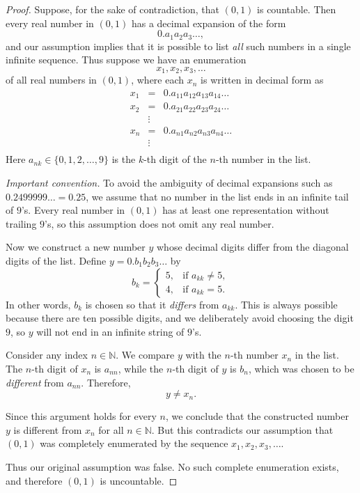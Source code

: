 \begin{proof}
Suppose, for the sake of contradiction, that $(0,1)$ is countable.
Then every real number in $(0,1)$ has a decimal expansion of the form
\[
0.a_1 a_2 a_3 \dots,
\]
and our assumption implies that it is possible to list \emph{all} such
numbers in a single infinite sequence.  Thus suppose we have an
enumeration
\[
x_1, x_2, x_3, \ldots
\]
of all real numbers in $(0,1)$, where each $x_n$ is written in decimal
form as
\[
\begin{array}{ccc}
x_1 & = & 0.a_{11} a_{12} a_{13} a_{14} \dots \\
x_2 & = & 0.a_{21} a_{22} a_{23} a_{24} \dots \\
       & \vdots & \\
x_n & = & 0.a_{n1} a_{n2} a_{n3} a_{n4} \dots \\
  & \vdots & \\
\end{array}
\]
Here $a_{nk} \in \{0,1,2,\dots,9\}$ is the $k$-th digit of the $n$-th
number in the list.

\medskip
\noindent\emph{Important convention.}  
To avoid the ambiguity of decimal expansions such as
$0.2499999\ldots = 0.25$, we assume that no number in the list ends in
an infinite tail of $9$'s.  Every real number in $(0,1)$ has at least one
representation without trailing $9$'s, so this assumption does not omit
any real number.

\medskip
Now we construct a new number $y$ whose decimal digits differ from
the diagonal digits of the list.  Define
$y = 0.b_1 b_2 b_3 \dots$ by
\[
b_k =
\begin{cases}
5, &\text{if } a_{kk} \neq 5,\\[4pt]
4, &\text{if } a_{kk} = 5.
\end{cases}
\]
In other words, $b_k$ is chosen so that it \emph{differs} from $a_{kk}$.
This is always possible because there are ten possible digits, and we
deliberately avoid choosing the digit $9$, so $y$ will not end in an
infinite string of $9$'s.

\medskip
Consider any index $n\in\mathbb{N}$.  We compare $y$ with the $n$-th
number $x_n$ in the list.  The $n$-th digit of $x_n$ is $a_{nn}$, while
the $n$-th digit of $y$ is $b_n$, which was chosen to be \emph{different}
from $a_{nn}$.  Therefore,
\[
y \neq x_n.
\]

Since this argument holds for every $n$, we conclude that the constructed
number $y$ is different from $x_n$ for all $n\in\mathbb{N}$.  But this
contradicts our assumption that $(0,1)$ was completely enumerated by the
sequence $x_1, x_2, x_3, \dots$.

\medskip
Thus our original assumption was false.  No such complete enumeration
exists, and therefore $(0,1)$ is uncountable.
\end{proof}

